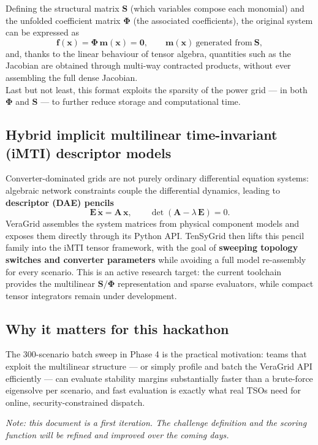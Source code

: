 \documentclass[11pt,a4paper]{article}
\begin{document}
Defining the structural matrix $\mathbf{S}$ (which variables compose each monomial) and the unfolded coefficient matrix $\boldsymbol{\Phi}$ (the associated coefficients), the original system can be expressed as
\begin{equation}
  \mathbf{f}(\mathbf{x})=\boldsymbol{\Phi}\,\mathbf{m}(\mathbf{x})=\mathbf{0},
  \qquad \mathbf{m}(\mathbf{x})\ \text{generated from}\ \mathbf{S},
\end{equation}
and, thanks to the linear behaviour of tensor algebra, quantities such as the Jacobian are obtained through multi-way contracted products, without ever assembling the full dense Jacobian.\\

Last but not least, this format exploits the sparsity of the power grid --- in both $\boldsymbol{\Phi}$ and $\mathbf{S}$ --- to further reduce storage and computational time.
\subsection*{Hybrid implicit multilinear time-invariant (iMTI) descriptor models}

Converter-dominated grids are not purely ordinary differential equation systems: algebraic network constraints couple the differential dynamics, leading to \textbf{descriptor (DAE) pencils}
\[
  \mathbf{E}\,\dot{\mathbf{x}} = \mathbf{A}\,\mathbf{x}, \qquad \det(\mathbf{A} - \lambda\,\mathbf{E}) = 0.
\]
VeraGrid assembles the system matrices from physical component models and exposes them directly through its Python API. TenSyGrid then lifts this pencil family into the iMTI tensor framework, with the goal of \textbf{sweeping topology switches and converter parameters} while avoiding a full model re-assembly for every scenario. This is an active research target: the current toolchain provides the multilinear $\mathbf{S}/\boldsymbol{\Phi}$ representation and sparse evaluators, while compact tensor integrators remain under development.

\subsection*{Why it matters for this hackathon}

The 300-scenario batch sweep in Phase 4 is the practical motivation: teams that exploit the multilinear structure --- or simply profile and batch the VeraGrid API efficiently --- can evaluate stability margins substantially faster than a brute-force eigensolve per scenario, and fast evaluation is exactly what real TSOs need for online, security-constrained dispatch.

\bigskip
\noindent\textit{Note: this document is a first iteration. The challenge definition and the scoring function will be refined and improved over the coming days.}
\end{document}
